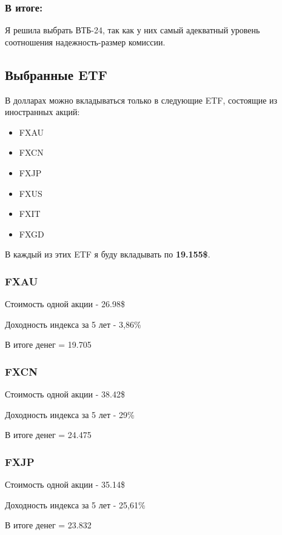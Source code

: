\subsubsection{В итоге:}

Я решила выбрать ВТБ-24, так как у них самый адекватный уровень соотношения надежность-размер комиссии.

\subsection{Выбранные ETF}

В долларах можно вкладываться только в следующие ETF, состоящие из иностранных акций:

\begin{itemize}
	\item FXAU
	\item FXCN
	\item FXJP
	\item FXUS
	\item FXIT
	\item FXGD
\end{itemize}

В каждый из этих ETF я буду вкладывать по \textbf{19.155\$}.

\subsubsection{FXAU}

Стоимость одной акции - 26.98\$

Доходность индекса за 5 лет - 3,86\%

В итоге денег = 19.705

\subsubsection{FXCN}

Стоимость одной акции - 38.42\$

Доходность индекса за 5 лет - 29\%

В итоге денег = 24.475

\subsubsection{FXJP}

Стоимость одной акции - 35.14\$

Доходность индекса за 5 лет - 25,61\%

В итоге денег = 23.832

